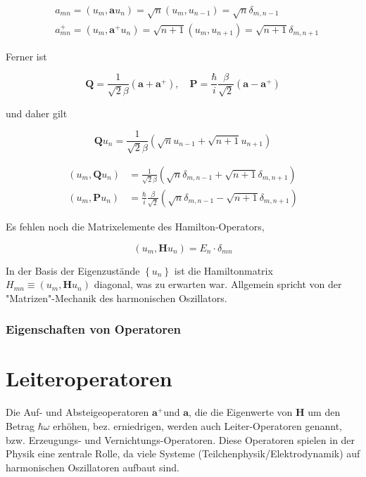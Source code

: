 \documentclass[10pt, letterpaper]{article}
\begin{document}
$$
\begin{aligned}
& a_{m n}=\left(u_{m}, \mathbf{a} u_{n}\right)=\sqrt{n}\left(u_{m}, u_{n-1}\right)=\sqrt{n} \delta_{m, n-1} \\
& a_{m n}^{+}=\left(u_{m}, \mathbf{a}^{+} u_{n}\right)=\sqrt{n+1}\left(u_{m}, u_{n+1}\right)=\sqrt{n+1} \delta_{m, n+1}
\end{aligned}
$$

Ferner ist

$$
\mathbf{Q}=\frac{1}{\sqrt{2} \beta}\left(\mathbf{a}+\mathbf{a}^{+}\right), \quad \mathbf{P}=\frac{\hbar}{i} \frac{\beta}{\sqrt{2}}\left(\mathbf{a}-\mathbf{a}^{+}\right)
$$

und daher gilt

$$
\mathbf{Q} u_{n}=\frac{1}{\sqrt{2} \beta}\left(\sqrt{n} u_{n-1}+\sqrt{n+1} u_{n+1}\right)
$$

$$
\begin{aligned}
\left(u_{m}, \mathbf{Q} u_{n}\right) & =\frac{1}{\sqrt{2} \beta}\left(\sqrt{n} \delta_{m, n-1}+\sqrt{n+1} \delta_{m, n+1}\right) \\
\left(u_{m}, \mathbf{P} u_{n}\right) & =\frac{\hbar}{i} \frac{\beta}{\sqrt{2}}\left(\sqrt{n} \delta_{m, n-1}-\sqrt{n+1} \delta_{m, n+1}\right)
\end{aligned}
$$

Es fehlen noch die Matrixelemente des Hamilton-Operators,

$$
\left(u_{m}, \mathbf{H} u_{n}\right)=E_{n} \cdot \delta_{m n}
$$

In der Basis der Eigenzustände $\left\{u_{n}\right\}$ ist die Hamiltonmatrix $H_{m n} \equiv\left(u_{m}, \mathbf{H} u_{n}\right)$ diagonal, was zu erwarten war. Allgemein spricht von der "Matrizen"-Mechanik des harmonischen Oszillators.

\subsubsection*{Eigenschaften von Operatoren}
\section*{Leiteroperatoren}
Die Auf- und Absteigeoperatoren $\mathbf{a}^{+}$und $\mathbf{a}$, die die Eigenwerte von $\mathbf{H}$ um den Betrag $\hbar \omega$ erhöhen, bez. erniedrigen, werden auch Leiter-Operatoren genannt, bzw. Erzeugungs- und Vernichtungs-Operatoren. Diese Operatoren spielen in der Physik eine zentrale Rolle, da viele Systeme (Teilchenphysik/Elektrodynamik) auf harmonischen Oszillatoren aufbaut sind.
\end{document}
